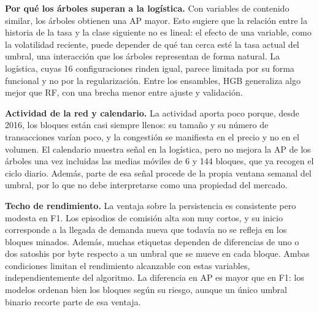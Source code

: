 \documentclass[conference]{IEEEtran}
\begin{document}
\textbf{Por qué los árboles superan a la logística.} Con variables de contenido similar, los árboles obtienen una AP mayor. Esto sugiere que la relación entre la historia de la tasa y la clase siguiente no es lineal: el efecto de una variable, como la volatilidad reciente, puede depender de qué tan cerca esté la tasa actual del umbral, una interacción que los árboles representan de forma natural. La logística, cuyas 16 configuraciones rinden igual, parece limitada por su forma funcional y no por la regularización. Entre los ensambles, HGB generaliza algo mejor que RF, con una brecha menor entre ajuste y validación.

\textbf{Actividad de la red y calendario.} La actividad aporta poco porque, desde 2016, los bloques están casi siempre llenos: su tamaño y su número de transacciones varían poco, y la congestión se manifiesta en el precio y no en el volumen. El calendario muestra señal en la logística, pero no mejora la AP de los árboles una vez incluidas las medias móviles de 6 y 144 bloques, que ya recogen el ciclo diario. Además, parte de esa señal procede de la propia ventana semanal del umbral, por lo que no debe interpretarse como una propiedad del mercado.

\textbf{Techo de rendimiento.} La ventaja sobre la persistencia es consistente pero modesta en F1. Los episodios de comisión alta son muy cortos, y su inicio corresponde a la llegada de demanda nueva que todavía no se refleja en los bloques minados. Además, muchas etiquetas dependen de diferencias de uno o dos satoshis por byte respecto a un umbral que se mueve en cada bloque. Ambas condiciones limitan el rendimiento alcanzable con estas variables, independientemente del algoritmo. La diferencia en AP es mayor que en F1: los modelos ordenan bien los bloques según su riesgo, aunque un único umbral binario recorte parte de esa ventaja.
\end{document}
